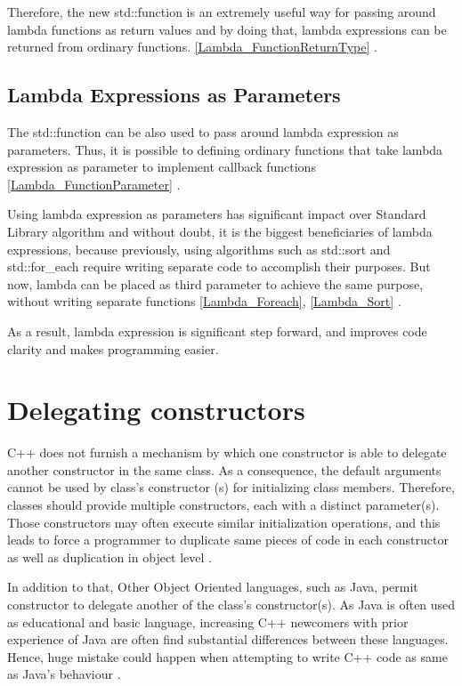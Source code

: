 \documentclass[11pt]{report}
\begin{document}
Therefore, the new std::function is an extremely useful way for passing around lambda functions as return values and by doing that, lambda expressions can be returned from ordinary functions. \ref{Lambda_FunctionReturnType} \cite {Josuttis:2012:CppStandard Library}.


\subsection{Lambda Expressions as Parameters}
\label{subsection: Lambda Expressions as Parameters}
The std::function can be also used to pass around lambda expression as parameters. Thus, it is possible to defining ordinary functions that take lambda expression as parameter to implement callback functions \ref{Lambda_FunctionParameter} \cite{Allain:2011:FutureCpp}.


Using lambda expression as parameters has significant impact over Standard Library algorithm and without doubt, it is the biggest beneficiaries of lambda expressions, because previously, using algorithms such as std::sort and std::for\_each require writing separate code to accomplish their purposes. But now, lambda can be placed as third parameter to achieve the same purpose, without writing separate functions \ref{Lambda_Foreach}, \ref{Lambda_Sort} \cite {Gregorie:professionalcpp}.


As a result, lambda expression is significant step forward, and improves code clarity and makes programming easier.

\section{Delegating constructors}
\label{section: Delegating constructors}
C++ does not furnish a mechanism by which one constructor is able to delegate another constructor in the same class.  As a consequence, the default arguments cannot be used by class's constructor (s) for initializing class members. Therefore, classes should provide multiple constructors, each with a distinct parameter(s). Those constructors may often execute similar initialization operations, and this leads to force a programmer to duplicate same pieces of code in each constructor as well as duplication in object level \cite{Overland:2011:CWF}.


In addition to that, Other Object Oriented languages, such as Java, permit constructor to delegate another of the class's constructor(s).  As Java is often used as educational and basic language, increasing C++ newcomers with prior experience of Java are often find substantial differences between these languages. Hence, huge mistake could happen when attempting to write C++ code as same as Java's behaviour \cite{Overland:2011:CWF}.
\end{document}

